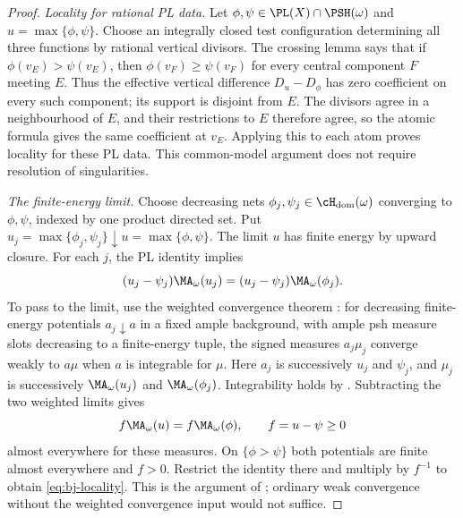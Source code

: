 \begin{proof}
\emph{Locality for rational PL data.}
Let $\phi,\psi\in\PL(X)\cap\PSH(\omega)$ and
$u=\max\{\phi,\psi\}$. Choose an integrally closed test configuration
determining all three functions by rational vertical divisors.
The crossing lemma \cite[Lemma~7.43]{BJ22} says that if
$\phi(v_E)>\psi(v_E)$, then $\phi(v_F)\ge\psi(v_F)$ for every central
component $F$ meeting $E$.  Thus the effective vertical difference
$D_u-D_\phi$ has zero coefficient on every such component; its support
is disjoint from $E$.  The divisors agree in a neighbourhood of $E$, and
their restrictions to $E$ therefore agree,
so the atomic formula gives the same coefficient at $v_E$.
Applying this to each atom proves locality for these PL data.
This common-model argument does not require resolution of singularities.

\emph{The finite-energy limit.}
Choose decreasing nets $\phi_j,\psi_j\in\cH_{\mathrm{dom}}(\omega)$
converging to $\phi,\psi$, indexed by one product directed set. Put
$u_j=\max\{\phi_j,\psi_j\}\downarrow u=\max\{\phi,\psi\}$.
The limit $u$ has finite energy by upward closure.
For each $j$, the PL identity implies
\[
 (u_j-\psi_j)\MA_\omega(u_j)
       =(u_j-\psi_j)\MA_\omega(\phi_j).
\]
To pass to the limit, use the weighted convergence theorem
\cite[Proposition~7.21(ii)]{BJ22}: for decreasing finite-energy
potentials $a_j\downarrow a$ in a fixed ample background, with ample
psh measure slots decreasing to a finite-energy tuple, the signed measures
$a_j\mu_j$ converge weakly to $a\mu$ when $a$ is integrable for $\mu$.
Here $a_j$ is successively $u_j$ and $\psi_j$, and $\mu_j$ is
successively $\MA_\omega(u_j)$ and $\MA_\omega(\phi_j)$.
Integrability holds by .
Subtracting the two weighted limits gives
\[
 f\MA_\omega(u)=f\MA_\omega(\phi),
 \qquad f=u-\psi\ge0
\]
almost everywhere for these measures. On $\{\phi>\psi\}$ both
potentials are finite almost everywhere and $f>0$.
Restrict the identity there and multiply by $f^{-1}$ to obtain
\eqref{eq:bj-locality}. This is the argument of
\cite[Theorem~7.40]{BJ22}; ordinary weak convergence without the
weighted convergence input would not suffice.


\end{proof}
